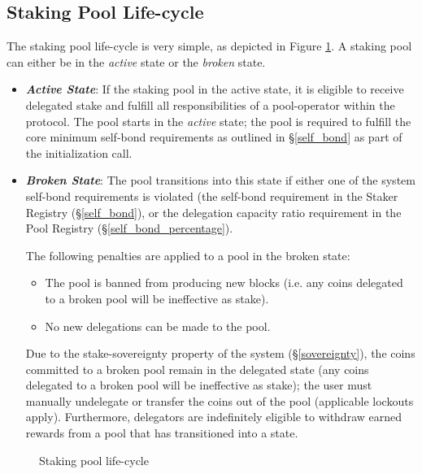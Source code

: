 \subsection{Staking Pool Life-cycle} \label{pool_states}
The staking pool life-cycle is very simple, as depicted in Figure \ref{fig:pool_lifecycle}. A staking pool can either be in the \textit{active} state or the \textit{broken} state. 
\begin{itemize}
	\item \textit{\textbf{Active State}}: If the staking pool in the active state, it is eligible to receive delegated stake and fulfill all responsibilities of a pool-operator within the protocol. The pool starts in the \textit{active} state; the pool is required to fulfill the core minimum self-bond requirements as outlined in \S\ref{self_bond} as part of the initialization call.
	\item \textit{\textbf{Broken State}}: The pool transitions into this state if either one of the system self-bond requirements is violated (the self-bond requirement in the Staker Registry (\S\ref{self_bond}), or the delegation capacity ratio requirement in the Pool Registry (\S\ref{self_bond_percentage}).

The following penalties are applied to a pool in the broken state:
\begin{itemize} [label=--,nosep]
	\item The pool is banned from producing new blocks (i.e. any coins delegated to a broken pool will be ineffective as stake).
	\item No new delegations can be made to the pool. 
\end{itemize}
Due to the stake-sovereignty property of the system (\S\ref{sovereignty}), the coins committed to a broken pool remain in the delegated state (any coins delegated to a broken pool will be ineffective as stake); the user must manually undelegate or transfer the coins out of the pool (applicable lockouts apply). Furthermore, delegators are indefinitely eligible to withdraw earned rewards from a pool that has transitioned into a  state. 
\end{itemize}

\begin{figure}[ht]
\centering
{}
\begin{center}
\end{center}
\caption{Staking pool life-cycle}
\label{fig:pool_lifecycle}
\end{figure}

